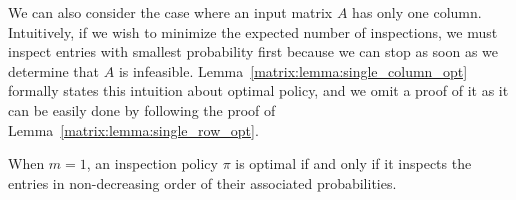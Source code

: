  We can also consider the case where an input matrix $A$ has only one column.
 Intuitively, if we wish to minimize the expected number of inspections, we must inspect entries with smallest probability first because we can stop as soon as we determine that $A$ is infeasible.
 Lemma~\ref{matrix:lemma:single_column_opt} formally states this intuition about optimal policy, and we omit a proof of it as it can be easily done by following the proof of Lemma~\ref{matrix:lemma:single_row_opt}. %
 \begin{lemma} \label{matrix:lemma:single_column_opt}
 When $m = 1$, an inspection policy $\pi$ is optimal if and only if it inspects the entries in non-decreasing order of their associated probabilities.
 \end{lemma}


